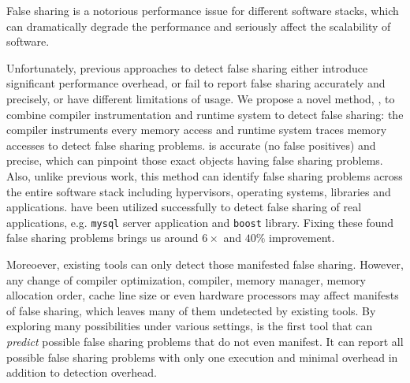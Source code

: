
\begin{comment}
False sharing is notorious for performance degradation in multithreaded
programs. It apprears when two or more threads running on different cores periodically access 
different portions of data that can fit into one cache line. Since caching
system in a multicore processor needs to ensure a coherent view of memory
accross all cores, it has to grant an exclusive access
for each write operation by invidating duplicate copies in other cores. As a
result, frequent cache invalidation can seriously affect the scalability and
performance of multithreaded programs.
\end{comment} 

False sharing is a notorious performance issue for different software stacks, 
which can dramatically degrade the performance and seriously affect the scalability 
of software.

Unfortunately, previous approaches to detect false sharing
either introduce significant performance overhead, or fail
to report false sharing accurately and precisely, or have different limitations of usage. 
We propose a novel method, , to combine compiler instrumentation
and runtime system to detect false sharing: 
the compiler instruments every memory access and 
runtime system traces memory accesses to detect false sharing problems.
 is accurate (no false positives) and precise, which can pinpoint 
those exact objects having false sharing problems.
Also, unlike previous work, this method can
identify false sharing problems across the entire software stack including 
hypervisors, operating systems, libraries and applications. 
 have been utilized successfully to detect false sharing of real applications,
e.g. \texttt{mysql} server application and \texttt{boost} library. Fixing these found
false sharing problems brings us around $6\times$ and $40\%$ improvement.

Moreoever, existing tools can only detect those manifested false sharing.
However, any change of compiler optimization, compiler, memory manager, 
memory allocation order, cache line size or even hardware processors 
may affect manifests of false sharing, which leaves many of them undetected by existing tools. 
By exploring many possibilities under various settings,
\Defaults{} is the first tool that can {\it predict} possible false sharing
problems that do not even manifest. It can report all possible false
sharing problems with only one execution and minimal overhead in addition to
detection overhead. 

